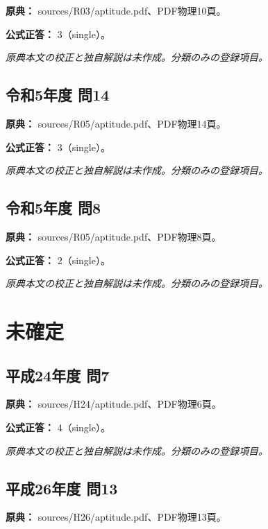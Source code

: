 \noindent\textbf{原典：} sources/R03/aptitude.pdf、PDF物理10頁。

\textbf{公式正答：} 3（single）。

\par\textit{原典本文の校正と独自解説は未作成。分類のみの登録項目。}

\subsection{令和5年度 問14}
\label{q:r05-reg-apt-14}

\noindent\textbf{原典：} sources/R05/aptitude.pdf、PDF物理14頁。

\textbf{公式正答：} 3（single）。

\par\textit{原典本文の校正と独自解説は未作成。分類のみの登録項目。}

\subsection{令和5年度 問8}
\label{q:r05-reg-apt-08}

\noindent\textbf{原典：} sources/R05/aptitude.pdf、PDF物理8頁。

\textbf{公式正答：} 2（single）。

\par\textit{原典本文の校正と独自解説は未作成。分類のみの登録項目。}

\section{未確定}

\subsection{平成24年度 問7}
\label{q:h24-reg-apt-07}

\noindent\textbf{原典：} sources/H24/aptitude.pdf、PDF物理6頁。

\textbf{公式正答：} 4（single）。

\par\textit{原典本文の校正と独自解説は未作成。分類のみの登録項目。}

\subsection{平成26年度 問13}
\label{q:h26-reg-apt-13}

\noindent\textbf{原典：} sources/H26/aptitude.pdf、PDF物理13頁。

